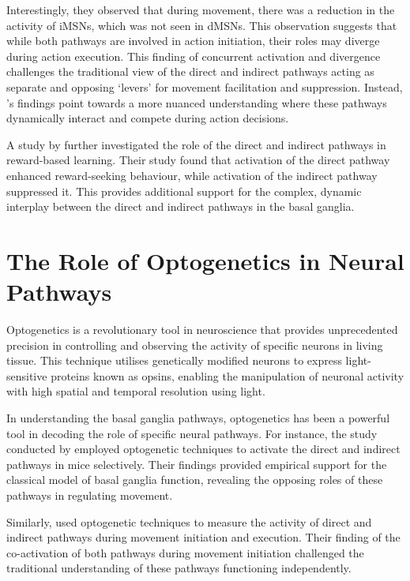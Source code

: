\documentclass[10pt]{article}
\begin{document}
\begin{sloppypar}
  Interestingly, they observed that during movement, there was a reduction in the activity of iMSNs, which was not seen in dMSNs. This observation suggests that while both pathways are involved in action initiation, their roles may diverge during action execution. This finding of concurrent activation and divergence challenges the traditional view of the direct and indirect pathways acting as separate and opposing ‘levers’ for movement facilitation and suppression. Instead, \citeauthor{cui_concurrent_2013}’s findings point towards a more nuanced understanding where these pathways dynamically interact and compete during action decisions.

  A study by \cite{guillaumin_optogenetic_2020} further investigated the role of the direct and indirect pathways in reward-based learning. Their study found that activation of the direct pathway enhanced reward-seeking behaviour, while activation of the indirect pathway suppressed it. This provides additional support for the complex, dynamic interplay between the direct and indirect pathways in the basal ganglia.

  \section{The Role of Optogenetics in Neural Pathways}
  \label{sec:the-role-of-optogenetics-in-neural-pathways}

  Optogenetics is a revolutionary tool in neuroscience that provides unprecedented precision in controlling and observing the activity of specific neurons in living tissue. This technique utilises genetically modified neurons to express light-sensitive proteins known as opsins, enabling the manipulation of neuronal activity with high spatial and temporal resolution using light.

  In understanding the basal ganglia pathways, optogenetics has been a powerful tool in decoding the role of specific neural pathways. For instance, the study conducted by \cite{kravitz_regulation_2010} employed optogenetic techniques to activate the direct and indirect pathways in mice selectively. Their findings provided empirical support for the classical model of basal ganglia function, revealing the opposing roles of these pathways in regulating movement.

  Similarly, \cite{cui_concurrent_2013} used optogenetic techniques to measure the activity of direct and indirect pathways during movement initiation and execution. Their finding of the co-activation of both pathways during movement initiation challenged the traditional understanding of these pathways functioning independently.


\end{sloppypar}
\end{document}
